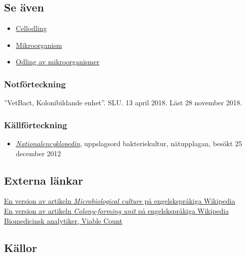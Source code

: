 \documentclass{article}
\begin{document}
\subsection{Se även}
\begin{itemize}
\item
\href{https://sv.wikipedia.org/wiki/Cellodling}{Cellodling}
\item
\href{https://sv.wikipedia.org/wiki/Mikroorganism}{Mikroorganism}
\item
\href{https://}{Odling av mikroorganismer} %
\end{itemize}

\begin{thebibliography}{}
\subsubsection{Notförteckning}
”VetBact, Kolonibildande enhet”. SLU. 13 april 2018. Läst 28 november 2018.

\subsubsection{Källförteckning}
\begin{itemize}
\item
\href{https://sv.wikipedia.org/wiki/Nationalencyklopedin}{\textit{Nationalencyklopedin}}, uppslagsord bakteriekultur, nätupplagan, besökt 25 december 2012
\end{itemize}
\end{thebibliography}


\subsection{Externa länkar}
\href{https://en.wikipedia.org/w/index.php?title=Microbiological_culture&oldid=76952828}{En version av artikeln \textit{Microbiological culture} på engelskspråkiga Wikipedia} \\
\href{https://en.wikipedia.org/wiki/Colony-forming_unit}{En version av artikeln \textit{Colony-forming unit} på engelskspråkiga Wikipedia} \\
\href{https://biomedicinskanalytiker.org/2013/12/21/viable-count/}{Biomedicinsk analytiker, Viable Count}

\subsection{Källor}
\end{document}
